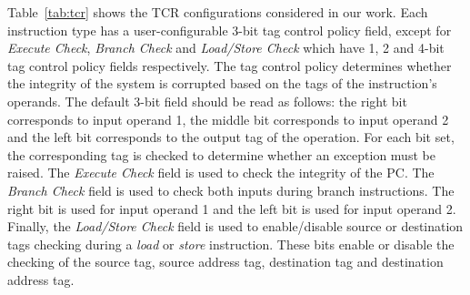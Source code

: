 Table~\ref{tab:tcr} shows the TCR configurations considered in our work.
Each instruction type has a user-configurable 3-bit tag control policy field, except for \textit{Execute Check}, \textit{Branch Check} and \textit{Load/Store Check} which have 1, 2 and 4-bit tag control policy fields respectively.
The tag control policy determines whether the integrity of the system is corrupted based on the tags of the instruction's operands. 
The default 3-bit field should be read as follows: the right bit corresponds to input operand 1, the middle bit corresponds to input operand 2 and the left bit corresponds to the output tag of the operation. For each bit set, the corresponding tag is checked to determine whether an exception must be raised.
The \textit{Execute Check} field is used to check the integrity of the PC. 
The \textit{Branch Check} field is used to check both inputs during branch instructions. The right bit is used for input operand 1 and the left bit is used for input operand 2.
Finally, the \textit{Load/Store Check} field is used to enable/disable source or destination tags checking during a \textit{load} or \textit{store} instruction. These bits enable or disable the checking of the source tag, source address tag, destination tag and destination address tag.

